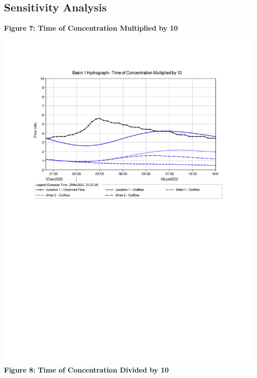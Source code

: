 \documentclass{article}
\begin{document}
\subsection{Sensitivity Analysis}
\begin{center}
    {\large{\bf Figure 7: Time of Concentration Multiplied by 10\\}}
    \includegraphics*[scale=0.7, trim = {0 13cm 0 3.1cm}]{results/Basin_1_Hydrograph_-_Time_of_Concentration_Multiplied_by_10.pdf}
    \vspace{5mm}
    {\large{\bf \\Figure 8: Time of Concentration Divided by 10\\}}

\end{center}
\end{document}
